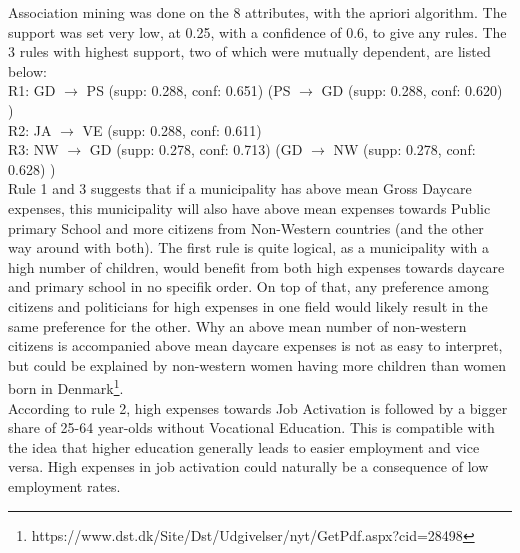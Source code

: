 Association mining was done on the 8 attributes, with the apriori algorithm.
The support was set very low, at 0.25, with a confidence of 0.6, to give any rules.
The 3 rules with highest support, two of which were mutually dependent, are listed below: \\
R1: GD $ \rightarrow $ PS  (supp: 0.288, conf: 0.651)
(PS $ \rightarrow $ GD  (supp: 0.288, conf: 0.620) ) \\
R2: JA $ \rightarrow $ VE  (supp: 0.288, conf: 0.611)  \\
R3: NW $ \rightarrow $ GD  (supp: 0.278, conf: 0.713) (GD $ \rightarrow $ NW  (supp: 0.278, conf: 0.628) ) \\
Rule 1 and 3 suggests that if a municipality has above mean Gross Daycare expenses, this municipality will also have above mean expenses towards Public primary School and more citizens from Non-Western countries (and the other way around with both). The first rule is quite logical, as a municipality with a high number of children, would benefit from both high expenses towards daycare and primary school in no specifik order. On top of that, any preference among citizens and politicians for high expenses in one field would likely result in the same preference for the other. Why an above mean number of non-western citizens is accompanied above mean daycare expenses is not as easy to interpret, but could be explained by non-western women having more children than women born in Denmark\footnote{https://www.dst.dk/Site/Dst/Udgivelser/nyt/GetPdf.aspx?cid=28498}.\\
According to rule 2, high expenses towards Job Activation is followed by a bigger share of 25-64 year-olds without Vocational Education. This is compatible with the idea that higher education generally leads to easier employment and vice versa. High expenses in job activation could naturally be a consequence of low employment rates.